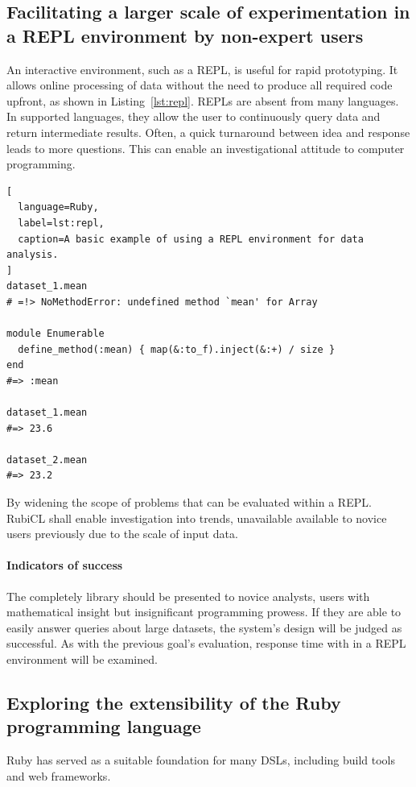 \subsection{Facilitating a larger scale of experimentation in a REPL environment by non-expert users}

An interactive environment, such as a \ac{REPL}, is useful for rapid prototyping. It allows online processing of data without the need to produce all required code upfront, as shown in Listing~\ref{lst:repl}. \acp{REPL} are absent from many languages. In supported languages, they allow the user to continuously query data and return intermediate results. Often, a quick turnaround between idea and response leads to more questions. This can enable an investigational attitude to computer programming.

\begin{lstlisting}[
  language=Ruby,
  label=lst:repl,
  caption=A basic example of using a REPL environment for data analysis.
]
dataset_1.mean
# =!> NoMethodError: undefined method `mean' for Array

module Enumerable
  define_method(:mean) { map(&:to_f).inject(&:+) / size }
end
#=> :mean

dataset_1.mean
#=> 23.6

dataset_2.mean
#=> 23.2
\end{lstlisting}

By widening the scope of problems that can be evaluated within a \ac{REPL}. RubiCL shall enable investigation into trends, unavailable available to novice users previously due to the scale of input data.

\paragraph*{Indicators of success}
The completely library should be presented to novice analysts, users with mathematical insight but insignificant programming prowess. If they are able to easily answer queries about large datasets, the system's design will be judged as successful. As with the previous goal's evaluation, response time with in a \ac{REPL} environment will be examined.

\subsection{Exploring the extensibility of the Ruby programming language}
Ruby has served as a suitable foundation for many \acp{DSL}, including build tools\cite{rake} and web frameworks\cite{sinatra}.

